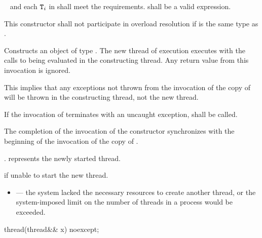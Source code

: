 \begin{itemdescr}
\pnum
\requires\  and each $\texttt{T}_i$ in  shall meet the
 requirements.
shall be a valid expression.

\pnum
\remarks
This constructor shall not participate in overload resolution if 
is the same type as .

\pnum
\effects
Constructs an object of type . The new thread of execution executes
 with the calls to
 being evaluated in the constructing thread. Any return value from this invocation
is ignored.
\begin{note}
This implies that any exceptions not thrown from the invocation of the copy
of  will be thrown in the constructing thread, not the new thread.
\end{note}
If the
invocation of
termi\-nates with an uncaught exception,  shall be called.


\pnum
\sync
The completion of the invocation of the constructor
synchronizes with the beginning of the invocation of the copy of .

\pnum
\ensures
{}.  represents the newly started thread.

\pnum
\throws
{} if unable to start the new thread.

\pnum
\errors
\begin{itemize}
\item {} --- the system lacked the necessary
resources to create another thread, or the system-imposed limit on the number of
threads in a process would be exceeded.
\end{itemize}
\end{itemdescr}

%
\begin{itemdecl}
thread(thread&& x) noexcept;
\end{itemdecl}

